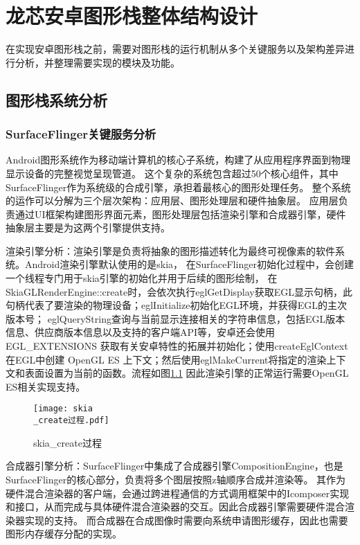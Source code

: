 
\chapter{龙芯安卓图形栈整体结构设计}
在实现安卓图形栈之前，需要对图形栈的运行机制从多个关键服务以及架构差异进行分析，并整理需要实现的模块及功能。

\section{图形栈系统分析}
\subsection{SurfaceFlinger关键服务分析}
Android图形系统作为移动端计算机的核心子系统，构建了从应用程序界面到物理显示设备的完整视觉呈现管道。
这个复杂的系统包含超过50个核心组件，其中SurfaceFlinger作为系统级的合成引擎，承担着最核心的图形处理任务。
整个系统的运作可以分解为三个层次架构：应用层、图形处理层和硬件抽象层。
应用层负责通过UI框架构建图形界面元素，图形处理层包括渲染引擎和合成器引擎，硬件抽象层主要是为这两个引擎提供支持。

渲染引擎分析：渲染引擎​是负责将抽象的图形描述转化为最终可视像素的软件系统。Android渲染引擎默认使用的是skia，
在SurfaceFlinger初始化过程中，会创建一个线程专门用于skia引擎的初始化并用于后续的图形绘制，
在SkiaGLRenderEngine::create时，会依次执行eglGetDisplay获取EGL显示句柄，此句柄代表了要渲染的物理设备；eglInitialize初始化EGL环境，并获得EGL的主次版本号；
eglQueryString查询与当前显示连接相关的字符串信息，包括EGL版本信息、供应商版本信息以及支持的客户端API等，安卓还会使用EGL\_EXTENSIONS
获取有关安卓特性的拓展并初始化；使用createEglContext在EGL中创建 OpenGL ES 上下文；然后使用eglMakeCurrent将指定的渲染上下文和表面设置为当前的函数。流程如图\ref{fig:skia_create过程}
因此渲染引擎的正常运行需要OpenGL ES相关实现支持。

\begin{figure}
  \centering
  \texttt{[image: skia\\\_create过程.pdf]}
  \caption{skia\_create过程}
  \label{fig:skia_create过程}
\end{figure}

合成器引擎分析：SurfaceFlinger中集成了合成器引擎CompositionEngine，也是SurfaceFlinger的核心部分，负责将多个图层按照z轴顺序合成并渲染等。
其作为硬件混合渲染器的客户端，会通过跨进程通信的方式调用框架中的Icomposer实现和接口，从而完成与具体硬件混合渲染器的交互。因此合成器引擎需要硬件混合渲染器实现的支持。
而合成器在合成图像时需要向系统申请图形缓存，因此也需要图形内存缓存分配的实现。


